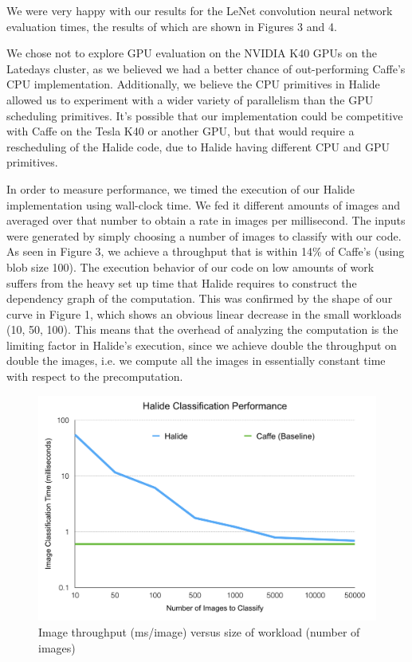 \documentclass[11pt,twoside]{article}
\begin{document}
We were very happy with our results for the LeNet convolution neural network evaluation times, the results of which are shown in Figures 3 and 4.

We chose not to explore GPU evaluation on the NVIDIA K40 GPUs on the Latedays cluster, as we believed we had a better chance of out-performing Caffe's CPU implementation.  
Additionally, we believe the CPU primitives in Halide allowed us to experiment with a wider variety of parallelism than the GPU scheduling primitives.  
It's possible that our implementation could be competitive with Caffe on the Tesla K40 or another GPU, but that would require a rescheduling of the Halide code, due to Halide having different CPU and GPU primitives.

In order to measure performance, we timed the execution of our Halide implementation using wall-clock time.  
We fed it different amounts of images and averaged over that number to obtain a rate in images per millisecond.  
The inputs were generated by simply choosing a number of images to classify with our code.  
As seen in Figure 3, we achieve a throughput that is within 14\% of Caffe's (using blob size 100).  
The execution behavior of our code on low amounts of work suffers from the heavy set up time that Halide requires to construct the dependency graph of the computation.  
This was confirmed by the shape of our curve in Figure 1, which shows an obvious linear decrease in the small workloads (10, 50, 100).  
This means that the overhead of analyzing the computation is the limiting factor in Halide's execution, since we achieve double the throughput on double the images, i.e. we compute all the images in essentially constant time with respect to the precomputation.  

\begin{figure}
\centering
\includegraphics[scale=.5]{graph.png}
\caption{Image throughput (ms/image) versus size of workload (number of images)}
\end{figure}
\end{document}
